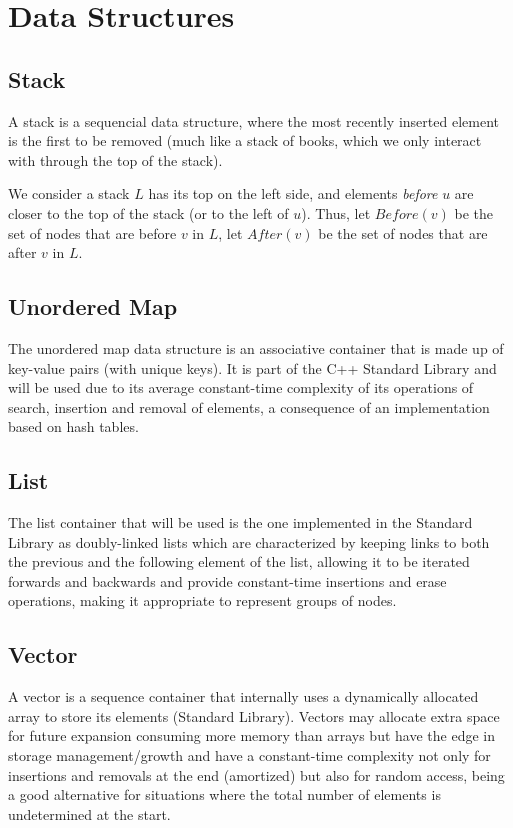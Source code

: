 \chapter{Data Structures} \label{data-structures}

\section{Stack}
A stack is a sequencial data structure, where the most recently inserted element is the first to be removed (much like a stack of books, which we only interact with through the top of the stack).\par
We consider a stack $L$ has its top on the left side, and elements \emph{before} $u$ are closer to the top of the stack (or to the left of $u$). Thus, let $Before(v)$ be the set of nodes that are before $v$ in $L$, let $After(v)$ be the set of nodes that are after $v$ in $L$.

\section{Unordered Map}
The unordered map data structure is an associative container that is made up of key-value pairs (with unique keys). It is part of the C++ Standard Library and will be used due to its average constant-time complexity of its operations of search, insertion and removal of elements, a consequence of an implementation based on hash tables.

\section{List}
The list container that will be used is the one implemented in the Standard Library as doubly-linked lists which are characterized by keeping links to both the previous and the following element of the list, allowing it to be iterated forwards and backwards and provide constant-time insertions and erase operations, making it appropriate to represent groups of nodes.

\section{Vector}
A vector is a sequence container that internally uses a dynamically allocated array to store its elements (Standard Library). Vectors may allocate extra space for future expansion consuming more memory than arrays but have the edge in storage management/growth and have a constant-time complexity not only for insertions and removals at the end (amortized) but also for random access, being a good alternative for situations where the total number of elements is undetermined at the start.

